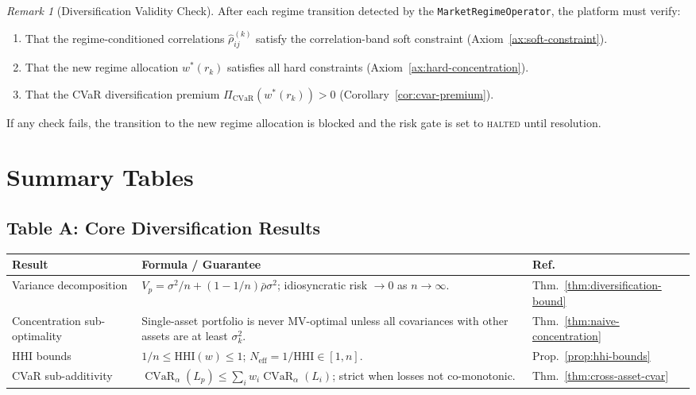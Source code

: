 \documentclass[12pt,openany]{book}
\newcommand{\bfw}{\mathbf{w}}
\DeclareMathOperator{\CVaR}{CVaR}
\numberwithin{equation}{chapter}
\theoremstyle{plain}
\theoremstyle{definition}
\theoremstyle{remark}
\newtheorem{remark}[theorem]{Remark}
\def\bfw{w}%
\begin{document}
\begin{remark}[Diversification Validity Check]
After each regime transition detected by the
\texttt{MarketRegimeOperator}, the platform must verify:
\begin{enumerate}
  \item That the regime-conditioned correlations $\hat{\rho}_{ij}^{(k)}$
        satisfy the correlation-band soft constraint
        (Axiom~\ref{ax:soft-constraint}).
  \item That the new regime allocation $\bfw^{*}(r_k)$ satisfies
        all hard constraints (Axiom~\ref{ax:hard-concentration}).
  \item That the CVaR diversification premium
        $\Pi_{\mathrm{CVaR}}(\bfw^{*}(r_k)) > 0$
        (Corollary~\ref{cor:cvar-premium}).
\end{enumerate}
If any check fails, the transition to the new regime allocation
is blocked and the risk gate is set to \textsc{halted} until
resolution.
\end{remark}

\chapter*{Summary Tables}

\section*{Table A: Core Diversification Results}

\begin{center}
{\small
\begin{tabularx}{\textwidth}{@{} p{4.5cm} X p{3.8cm} @{}}
\hline
\textbf{Result} & \textbf{Formula / Guarantee} & \textbf{Ref.} \\
\hline
Variance decomposition &
  $V_p = \sigma^2/n + (1-1/n)\bar{\rho}\sigma^2$;
  idiosyncratic risk $\to 0$ as $n \to \infty$. &
  Thm.~\ref{thm:diversification-bound} \\
\addlinespace
Concentration sub-optimality &
  Single-asset portfolio is never MV-optimal unless all
  covariances with other assets are at least $\sigma_k^2$. &
  Thm.~\ref{thm:naive-concentration} \\
\addlinespace
HHI bounds &
  $1/n \leq \mathrm{HHI}(\bfw) \leq 1$;
  $N_{\mathrm{eff}} = 1/\mathrm{HHI} \in [1,n]$. &
  Prop.~\ref{prop:hhi-bounds} \\
\addlinespace
CVaR sub-additivity &
  $\CVaR_\alpha(L_p) \leq \sum_i w_i \CVaR_\alpha(L_i)$;
  strict when losses not co-monotonic. &
  Thm.~\ref{thm:cross-asset-cvar} \\
\hline
\end{tabularx}
}
\end{center}
\end{document}
